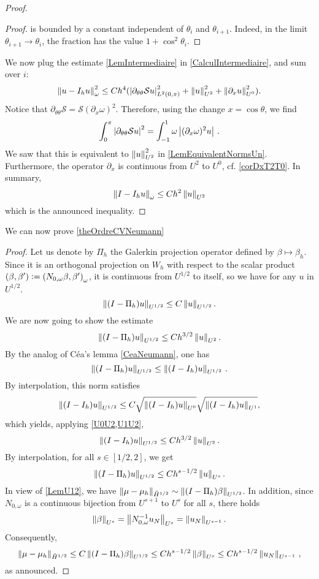 \documentclass[a4paper]{article}
\begin{document}
\begin{proof}
\begin{proof}
	is bounded by a constant independent of $\theta_i$ and $\theta_{i+1}$. Indeed, in the limit $\theta_{i+1} \to \theta_{i}$, the fraction has the value $1 + \cos^2\theta_i$. 
\end{proof}
	\noindent We now plug the estimate \autoref{LemIntermediaire} in \eqref{CalculIntermediaire}, and sum over $i$:
	\[\left\|u - I_hu\right\|^2_{\omega} \leq C h^4(\left\lvert \partial_{\theta\theta}\mathcal{S}u \right\rvert_{L^2(0,\pi)}^2 + \left\|u\right\|^2_{U^2} + \left\|\partial_x u\right\|_{U^0}^2).\]
	Notice that $\partial_{\theta\theta}\mathcal{S} = \mathcal{S}(\partial_x \omega)^2$. Therefore, using the change $x = \cos\theta$, we find 
	\[\int_{0}^\pi \left\lvert \partial_{\theta\theta}\mathcal{S}u \right\rvert^2 = \int_{-1}^{1} \omega\left\lvert (\partial_x \omega)^2 u \right\rvert\,.\]
	We saw that this is equivalent to $\left\|u\right\|_{U^2}^2$ in \autoref{LemEquivalentNormsUn}. Furthermore, the operator $\partial_x$ is continuous from $U^2$ to $U^0$, cf. \autoref{corDxT2T0}. In summary, 
	\[\left\|I - I_h u\right\|_{\omega} \leq C h^2 \left\|u\right\|_{U^2}\]
	which is the announced inequality. 
\end{proof}
\noindent We can now prove \autoref{theOrdreCVNeumann}
\begin{proof}
	Let us denote by $\Pi_h$ the Galerkin projection operator defined by $\beta \mapsto \beta_h$. Since it is an orthogonal projection on $W_h$ with respect to the scalar product $(\beta,\beta') \mathrel{\mathop:}= \left( N_{0,\omega} \beta,\beta'\right)_\omega$, it is continuous from $U^{1/2}$ to itself, so we have for any $u$ in $U^{1/2}$. 
	\[\left\|(I - \Pi_h)u\right\|_{U^{1/2}} \leq C \left\|u\right\|_{U^{1/2}}.\]
	We are now going to show the estimate
	\[\left\|(I - \Pi_h)u\right\|_{U^{1/2}} \leq C h^{3/2} \left\|u\right\|_{U^{2}}.\]
	By the analog of Céa's lemma \autoref{CeaNeumann}, one has 
	\[\left\|(I-\Pi_h)u\right\|_{U^{1/2}} \leq \left\|(I - I_h) u\right\|_{U^{1/2}}\,.\] 
	By interpolation, this norm satisfies
	\[\left\|(I - I_h)u\right\|_{U^{1/2}} \leq C \sqrt{\left\|(I - I_h)u\right\|_{U^{0}}}\sqrt{\left\|(I - I_h)u\right\|_{U^{1}}},\]
	which yields, applying \autoref{U0U2,U1U2},
	\[\left\|(I - I_h)u\right\|_{U^{1/2}} \leq C h^{3/2} \left\|u\right\|_{U^2}.\]
	By interpolation, for all $s \in [1/2,2]$, we get
	\[\left\|(I - \Pi_h)u\right\|_{U^{1/2}} \leq C h^{s - 1/2} \left\|u\right\|_{U^s}.\]
	In view of \autoref{LemU12}, we have $\left\|\mu - \mu_h\right\|_{\tilde{H}^{1/2}} \sim \left\|(I - \Pi_h)\beta\right\|_{U^{1/2}}$. In addition, since $N_{0,\omega}$ is a continuous bijection from $U^{s+1}$ to $U^s$ for all $s$, there holds
	\[\left\|\beta\right\|_{U^s} = \left\|N_{0,\omega}^{-1} u_N\right\|_{U^s} = \left\|u_N\right\|_{U^{s-1}}.\]
	Consequently, 
	\[\left\|\mu - \mu_h\right\|_{\tilde{H}^{1/2}} \leq  C\left\|(I - \Pi_h)\beta\right\|_{U^{1/2}} \leq C h^{s - 1/2} \left\|\beta\right\|_{U^s} \leq C h^{s - 1/2} \left\|u_N\right\|_{U^{s-1}}\,,\]
	as announced. 
\end{proof}
\end{document}
